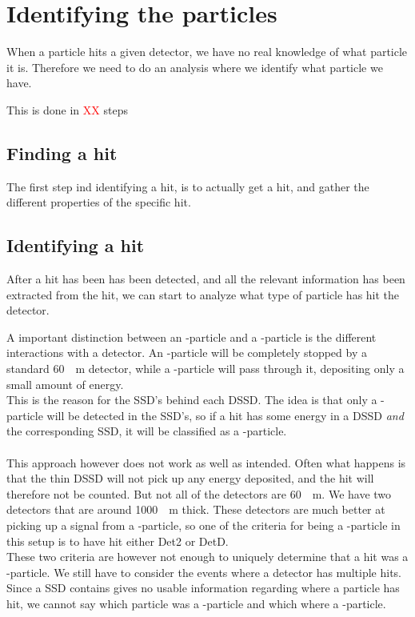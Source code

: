 \section{Identifying the particles}
When a particle hits a given detector, we have no real knowledge of what particle it is. 
Therefore we need to do an analysis where we identify what particle we have.

This is done in \textcolor{red}{XX} steps
\subsection{Finding a hit}
The first step ind identifying a hit, is to actually get a hit, and gather the different properties of the specific hit. 

\subsection{Identifying a hit}
After a hit has been has been detected, and all the relevant information has been extracted from the hit, we can start to analyze what type of particle has hit the detector. 

A important distinction between an \al-particle and a \be-particle is the different interactions with a detector. An \al-particle will be completely stopped by a standard \SI{60}{\mu m} detector, while a \be-particle will pass through it, depositing only a small amount of energy. \\
This is the reason for the SSD's behind each DSSD. The idea is that only a \be-particle will be detected in the SSD's, so if a hit has some energy in a DSSD \textit{and} the corresponding SSD, it will be classified as a \be-particle.\\
\\
This approach however does not work as well as intended. Often what happens is that the thin DSSD will not pick up any energy deposited, and the hit will therefore not be counted. 
But not all of the detectors are \SI{60}{\mu m}. We have two detectors that are around \SI{1000}{\mu m} thick. These detectors are much better at picking up a signal from a \be-particle, so one of the criteria for being a \be-particle in this setup is to have hit either Det2 or DetD.\\

These two criteria are however not enough to uniquely determine that a hit was a \be-particle. We still have to consider the events where a detector has multiple hits. Since a SSD contains gives no usable information regarding where a particle has hit, we cannot say which particle was a \be-particle and which where a \al-particle. 

